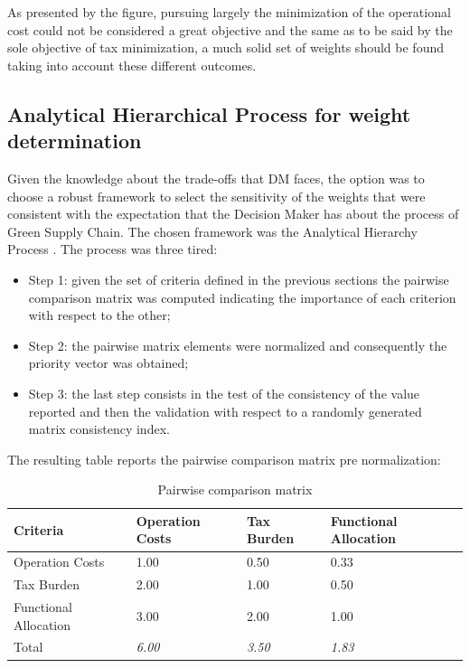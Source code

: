\begin{doublespace}
As presented by the figure, pursuing largely the minimization of the operational cost could not be considered a great objective and the same as to be said by the sole objective of tax minimization, a much solid set of weights should be found taking into account these different outcomes.

\subsection{Analytical Hierarchical Process for weight determination}
Given the knowledge about the trade-offs that DM faces, the option was to choose a robust framework to select the sensitivity of the weights that were consistent with the expectation that the Decision Maker has about the process of Green Supply Chain. The chosen framework was the Analytical Hierarchy Process \cite{Saaty1980}. The process was three tired:

\begin{itemize}
    \item Step 1: given the set of criteria defined in the previous sections the pairwise comparison matrix was computed indicating the importance of each criterion with respect to the other;
    \item Step 2: the pairwise matrix elements were normalized and consequently the priority vector was obtained;
    \item Step 3: the last step consists in the test of the consistency of the value reported and then the validation with respect to a randomly generated matrix consistency index.
\end{itemize}

The resulting table reports the pairwise comparison matrix pre normalization:

\begin{table}[ht]
\centering
\begin{tabular}{@{}llll@{}}
\toprule
\textbf{Criteria}     & Operation Costs & Tax Burden    & Functional Allocation \\ \midrule
Operation Costs       & 1.00            & 0.50          & 0.33                  \\
Tax Burden            & 2.00            & 1.00          & 0.50                  \\
Functional Allocation & 3.00            & 2.00          & 1.00                  \\
Total                 & \textit{6.00}   & \textit{3.50} & \textit{1.83}         \\ \bottomrule
\end{tabular}
\caption{Pairwise comparison matrix}
\end{table}


\end{doublespace}
